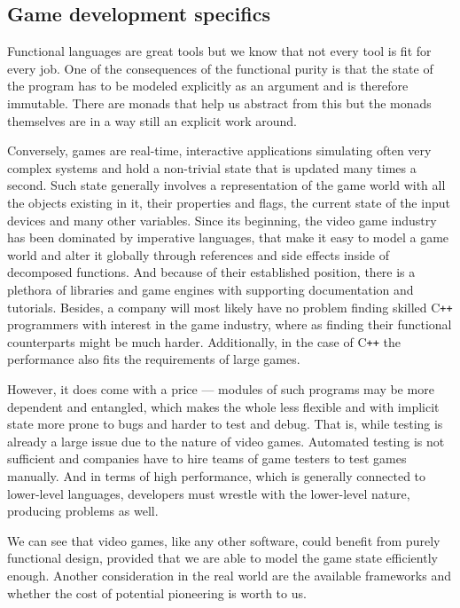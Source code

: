 \documentclass[
  digital, %
  color,   %
  table,   %
  oneside, %
  lof,     %
  lot,     %
]{fithesis3}
\newcommand{\cpp}{C\nolinebreak\texttt{+}\nolinebreak\texttt{+}}
\begin{document}
\subsection{Game development specifics}
Functional languages are great tools but we know that not every tool is
fit for every job. One of the consequences of the functional purity is
that the state of the program has to be modeled explicitly as an argument
and is therefore immutable. There are monads that help us abstract
from this but the monads themselves are in a way still an explicit work around.

Conversely, games are real-time, interactive applications simulating
often very complex systems and hold a non-trivial state that is
updated many times a second. Such state generally involves a representation
of the game world with all the objects existing in it, their properties and flags,
the current state of the input devices and many other variables. Since its beginning,
the video game industry has been dominated by imperative languages,
that make it easy to model a game world and alter it globally through
references and side effects inside of decomposed functions. And because
of their established position, there is a plethora of libraries and game engines
with supporting documentation and tutorials. Besides, a company will most likely
have no problem finding skilled \cpp{} programmers with interest
in the game industry, where as finding their functional counterparts
might be much harder. Additionally, in the case of \cpp{} the performance
also fits the requirements of large games.

However, it does come with a price --- modules of such programs may be
more dependent and entangled, which makes the whole less flexible and with
implicit state more prone to bugs and harder to test and debug.
That is, while testing is already a large issue due to the nature of video games.
Automated testing is not sufficient and companies have to hire teams
of game testers to test games manually. And in terms of high performance,
which is generally connected to lower-level languages, developers must
wrestle with the lower-level nature, producing problems as well.

We can see that video games, like any other software, could benefit from
purely functional design, provided that we are able to model the
game state efficiently enough. Another consideration in the real world
are the available frameworks and whether the cost of potential
pioneering is worth to us.
\end{document}
